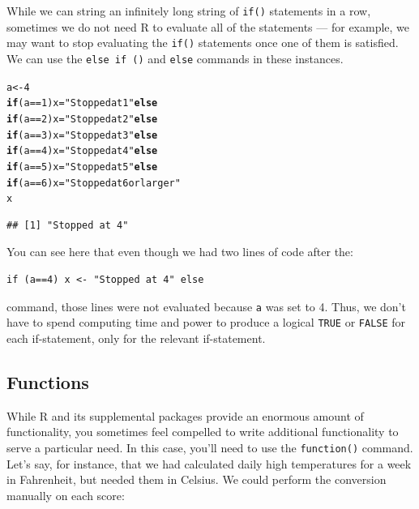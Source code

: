 \documentclass[12pt]{article}\usepackage[]{graphicx}\usepackage[]{color}
\makeatletter
\newcommand{\hlnum}[1]{\textcolor[rgb]{0.686,0.059,0.569}{#1}}%
\newcommand{\hlstr}[1]{\textcolor[rgb]{0.192,0.494,0.8}{#1}}%
\newcommand{\hlopt}[1]{\textcolor[rgb]{0,0,0}{#1}}%
\newcommand{\hlstd}[1]{\textcolor[rgb]{0.345,0.345,0.345}{#1}}%
\newcommand{\hlkwa}[1]{\textcolor[rgb]{0.161,0.373,0.58}{\textbf{#1}}}%
\newcommand{\hlkwb}[1]{\textcolor[rgb]{0.69,0.353,0.396}{#1}}%
\newenvironment{kframe}{%
 \def\at@end@of@kframe{}%
 \ifinner\ifhmode%
  \def\at@end@of@kframe{\end{minipage}}%
  \begin{minipage}{\columnwidth}%
 \fi\fi%
 \def\FrameCommand##1{\hskip\@totalleftmargin \hskip-\fboxsep
 \colorbox{shadecolor}{##1}\hskip-\fboxsep
     \hskip-\linewidth \hskip-\@totalleftmargin \hskip\columnwidth}%
 \MakeFramed {\advance\hsize-\width
   \@totalleftmargin\z@ \linewidth\hsize
   \@setminipage}}%
 {\par\unskip\endMakeFramed%
 \at@end@of@kframe}
\newenvironment{knitrout}{}{} %
\makeatother
\begin{document}
While we can string an infinitely long string of \texttt{if()} statements in a row, sometimes we do not need R to evaluate all of the statements --- for example, we may want to stop evaluating the \texttt{if()} statements once one of them is satisfied. We can use the \texttt{else if ()} and \texttt{else} commands in these instances.

\begin{knitrout}
\color{fgcolor}\begin{kframe}
\begin{alltt}
\hlstd{a} \hlkwb{<-} \hlnum{4}
\hlkwa{if} \hlstd{(a}\hlopt{==}\hlnum{1}\hlstd{) x}\hlkwb{=}\hlstr{"Stopped at 1"} \hlkwa{else}
\hlkwa{if} \hlstd{(a}\hlopt{==}\hlnum{2}\hlstd{) x}\hlkwb{=}\hlstr{"Stopped at 2"} \hlkwa{else}
\hlkwa{if} \hlstd{(a}\hlopt{==}\hlnum{3}\hlstd{) x}\hlkwb{=}\hlstr{"Stopped at 3"} \hlkwa{else}
\hlkwa{if} \hlstd{(a}\hlopt{==}\hlnum{4}\hlstd{) x}\hlkwb{=}\hlstr{"Stopped at 4"} \hlkwa{else}
\hlkwa{if} \hlstd{(a}\hlopt{==}\hlnum{5}\hlstd{) x}\hlkwb{=}\hlstr{"Stopped at 5"} \hlkwa{else}
\hlkwa{if} \hlstd{(a}\hlopt{==}\hlnum{6}\hlstd{) x}\hlkwb{=}\hlstr{"Stopped at 6 or larger"}
\hlstd{x}
\end{alltt}
\begin{verbatim}
## [1] "Stopped at 4"
\end{verbatim}
\end{kframe}
\end{knitrout}
You can see here that even though we had two lines of code after the:
\begin{verbatim}
if (a==4) x <- "Stopped at 4" else
\end{verbatim}
command, those lines were not evaluated because \texttt{a} was set to 4. Thus, we don't have to spend computing time and power to produce a logical \texttt{TRUE} or \texttt{FALSE} for each if-statement, only for the relevant if-statement.

\subsection{Functions}
While R and its supplemental packages provide an enormous amount of functionality, you sometimes feel compelled to write additional functionality to serve a particular need. In this case, you'll need to use the \texttt{function()} command. Let's say, for instance, that we had calculated daily high temperatures for a week in Fahrenheit, but needed them in Celsius. We could perform the conversion manually on each score:
\end{document}
